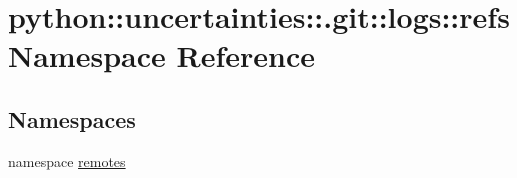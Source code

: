 \hypertarget{namespacepython_1_1uncertainties_1_1_8git_1_1logs_1_1refs}{
\section{python::uncertainties::.git::logs::refs Namespace Reference}
\label{namespacepython_1_1uncertainties_1_1_8git_1_1logs_1_1refs}
}
\subsection*{Namespaces}
\begin{DoxyCompactItemize}
\item 
namespace \hyperlink{namespacepython_1_1uncertainties_1_1_8git_1_1logs_1_1refs_1_1remotes}{remotes}
\end{DoxyCompactItemize}
